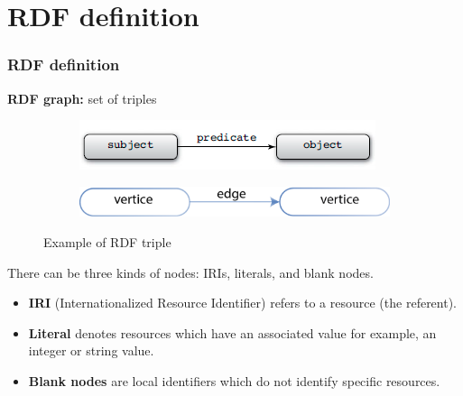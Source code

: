 \documentclass{beamer}
\numberwithin{figure}{section}
\numberwithin{equation}{section}
\begin{document}
\section{RDF definition}
\begin{frame}
 \frametitle{RDF definition}
 	\textbf{RDF graph:} set of triples 
 	\begin{figure}
        \centering
        \begin{subfigure}[h]{0.45\textwidth} 
            \includegraphics[width=\textwidth]{pictures/rdf_begin}
            \label{fig:rdf_begin}
        \end{subfigure}       
        \begin{subfigure}[h]{0.45\textwidth} 
            \includegraphics[width=\textwidth]{pictures/RDF_begin2}
            \label{fig:rdf_begin2}
        \end{subfigure}
        \caption{Example of RDF triple}
    \end{figure}

 	\justify There can be three kinds of nodes: IRIs, literals, and blank nodes.
	\begin{itemize}
    \footnotesize
    \vspace{5mm}
    \item  \justify \textbf{IRI} (Internationalized Resource Identifier) refers to a resource (the referent).
    \item  \justify \textbf{Literal} denotes resources which have an associated value for example, an integer or string value.
    \item  \justify \textbf{Blank nodes} are local identifiers which do not identify specific resources.
	\end{itemize}

\end{frame}

\end{document}
